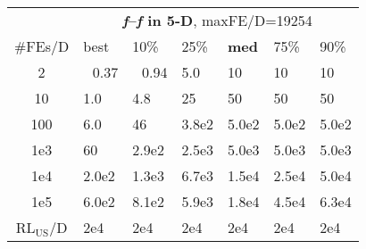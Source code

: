 \begin{tabular}{c|llllll}
 & \multicolumn{6}{|c}{\textbf{\textit{f}\raisebox{-0.35ex}{1}--\textit{f}\raisebox{-0.35ex}{24} in 5-D}, maxFE/D=19254}\\
\#FEs/D & best & 10\% & 25\% & \textbf{med} & 75\% & 90\%\\
2 & ~\,0.37 & ~\,0.94 & \hspace*{1ex}5.0 & 10 & 10 & 10\\
10 & \hspace*{1ex}1.0 & \hspace*{1ex}4.8 & 25 & 50 & 50 & 50\\
100 & \hspace*{1ex}6.0 & 46 & 3.8e2 & 5.0e2 & 5.0e2 & 5.0e2\\
1e3 & 60 & 2.9e2 & 2.5e3 & 5.0e3 & 5.0e3 & 5.0e3\\
1e4 & 2.0e2 & 1.3e3 & 6.7e3 & 1.5e4 & 2.5e4 & 5.0e4\\
1e5 & 6.0e2 & 8.1e2 & 5.9e3 & 1.8e4 & 4.5e4 & 6.3e4\\
$\text{RL}_{\text{US}}$/D & 2e4 & 2e4 & 2e4 & 2e4 & 2e4 & 2e4
\end{tabular}
